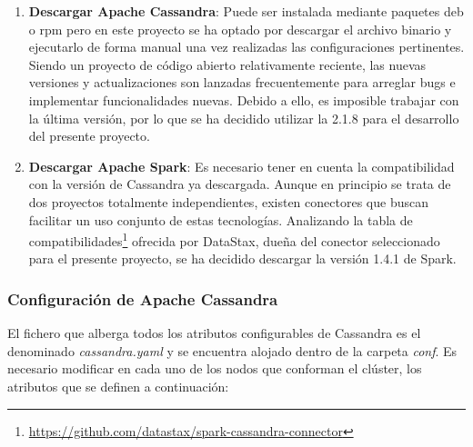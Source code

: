 \begin{enumerate}
\item \textbf{Descargar Apache Cassandra}: Puede ser instalada mediante paquetes deb o rpm pero en este proyecto se ha optado por descargar el archivo binario y ejecutarlo de forma manual una vez realizadas las configuraciones pertinentes.\\ 

Siendo un proyecto de código abierto relativamente reciente, las nuevas versiones y actualizaciones son lanzadas frecuentemente para arreglar bugs e implementar funcionalidades nuevas. Debido a ello, es imposible trabajar con la última versión, por lo que se ha decidido utilizar la 2.1.8 para el desarrollo del presente proyecto.

\item \textbf{Descargar Apache Spark}: Es necesario tener en cuenta la compatibilidad con la versión de Cassandra ya descargada. Aunque en principio se trata de dos proyectos totalmente independientes, existen conectores que buscan facilitar un uso conjunto de estas tecnologías. Analizando la tabla de compatibilidades\footnote{\url{https://github.com/datastax/spark-cassandra-connector}} ofrecida por DataStax, dueña del conector seleccionado para el presente proyecto, se ha decidido descargar la versión 1.4.1 de Spark.
	
\end{enumerate}

\subsubsection{Configuración de Apache Cassandra}

El fichero que alberga todos los atributos configurables de Cassandra es el denominado  \textit{cassandra.yaml} y se encuentra alojado dentro de la carpeta \textit{conf}. Es necesario modificar en cada uno de los nodos que conforman el clúster, los atributos que se definen a continuación:

